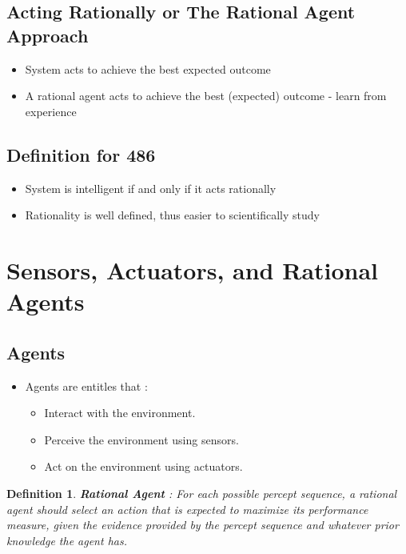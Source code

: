 \documentclass{article}
\newtheorem{definition}[theorem]{Definition}
\begin{document}
\subsection{Acting Rationally or The Rational Agent Approach }

\begin{itemize}
\item System acts to achieve the best expected outcome
\item A rational agent acts to achieve the best (expected) outcome - learn from experience
\end{itemize}

\subsection{Definition for 486}
\begin{itemize}
\item System is intelligent if and only if it acts rationally 
\item Rationality is well defined, thus easier to scientifically study
\end{itemize}



\section{Sensors, Actuators, and Rational Agents}

\subsection{Agents}
\begin{itemize}
\item Agents are entitles that :
\begin{itemize}
\item Interact with the environment.
\item Perceive the environment using sensors. 
\item Act on the environment using actuators.
\end{itemize} 
\end{itemize}

\begin{definition}\textbf{Rational Agent} :
For each possible percept sequence, a rational agent should select an action that is expected to maximize its performance measure, given the evidence provided by the percept sequence and whatever prior knowledge the agent has.
\end{definition}
\end{document}
